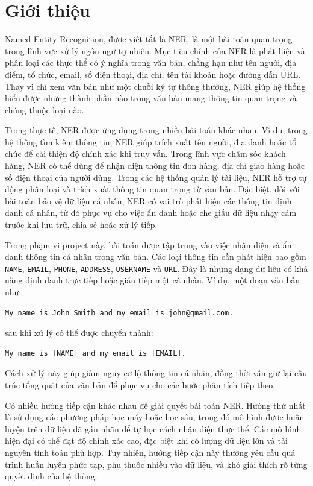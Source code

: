 \section{Giới thiệu}

Named Entity Recognition, được viết tắt là NER, là một bài toán quan trọng trong lĩnh vực xử lý ngôn ngữ tự nhiên. Mục tiêu chính của NER là phát hiện và phân loại các thực thể có ý nghĩa trong văn bản, chẳng hạn như tên người, địa điểm, tổ chức, email, số điện thoại, địa chỉ, tên tài khoản hoặc đường dẫn URL. Thay vì chỉ xem văn bản như một chuỗi ký tự thông thường, NER giúp hệ thống hiểu được những thành phần nào trong văn bản mang thông tin quan trọng và chúng thuộc loại nào.


Trong thực tế, NER được ứng dụng trong nhiều bài toán khác nhau. Ví dụ, trong hệ thống tìm kiếm thông tin, NER giúp trích xuất tên người, địa danh hoặc tổ chức để cải thiện độ chính xác khi truy vấn. Trong lĩnh vực chăm sóc khách hàng, NER có thể dùng để nhận diện thông tin đơn hàng, địa chỉ giao hàng hoặc số điện thoại của người dùng. Trong các hệ thống quản lý tài liệu, NER hỗ trợ tự động phân loại và trích xuất thông tin quan trọng từ văn bản. Đặc biệt, đối với bài toán bảo vệ dữ liệu cá nhân, NER có vai trò phát hiện các thông tin định danh cá nhân, từ đó phục vụ cho việc ẩn danh hoặc che giấu dữ liệu nhạy cảm trước khi lưu trữ, chia sẻ hoặc xử lý tiếp.

Trong phạm vi project này, bài toán được tập trung vào việc nhận diện và ẩn danh thông tin cá nhân trong văn bản. Các loại thông tin cần phát hiện bao gồm \texttt{NAME}, \texttt{EMAIL}, \texttt{PHONE}, \texttt{ADDRESS}, \texttt{USERNAME} và \texttt{URL}. Đây là những dạng dữ liệu có khả năng định danh trực tiếp hoặc gián tiếp một cá nhân. Ví dụ, một đoạn văn bản như:

\begin{verbatim}
My name is John Smith and my email is john@gmail.com.
\end{verbatim}

sau khi xử lý có thể được chuyển thành:

\begin{verbatim}
My name is [NAME] and my email is [EMAIL].
\end{verbatim}

Cách xử lý này giúp giảm nguy cơ lộ thông tin cá nhân, đồng thời vẫn giữ lại cấu trúc tổng quát của văn bản để phục vụ cho các bước phân tích tiếp theo.

Có nhiều hướng tiếp cận khác nhau để giải quyết bài toán NER. Hướng thứ nhất là sử dụng các phương pháp học máy hoặc học sâu, trong đó mô hình được huấn luyện trên dữ liệu đã gán nhãn để tự học cách nhận diện thực thể. Các mô hình hiện đại có thể đạt độ chính xác cao, đặc biệt khi có lượng dữ liệu lớn và tài nguyên tính toán phù hợp. Tuy nhiên, hướng tiếp cận này thường yêu cầu quá trình huấn luyện phức tạp, phụ thuộc nhiều vào dữ liệu, và khó giải thích rõ từng quyết định của hệ thống.

